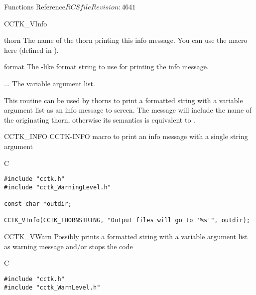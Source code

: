 \begin{cactuspart}{ Functions Reference}{$RCSfile$}{$Revision: 4641 $}
\begin{FunctionDescription}{CCTK\_VInfo}
\begin{ParameterSection}
\begin{Parameter}{thorn}
The name of the thorn printing this info message. You can use the
 macro here (defined in ).
\end{Parameter}
\begin{Parameter}{format}
The -like format string to use for printing the info message.
\end{Parameter}
\begin{Parameter}{...}
The variable argument list.
\end{Parameter}
\end{ParameterSection}

\begin{Discussion}
This routine can be used by thorns to print a formatted string with a variable
argument list as an info message to screen.
The message will include the name of the originating thorn, otherwise its
semantics is equivalent to .
\end{Discussion}

\begin{SeeAlsoSection}
\begin{SeeAlso2} {CCTK\_INFO} {CCTK-INFO}
macro to print an info message with a single string argument
\end{SeeAlso2}
\end{SeeAlsoSection}

\begin{ExampleSection}
\begin{Example}{C}
\begin{verbatim}
#include "cctk.h"
#include "cctk_WarningLevel.h"

const char *outdir;

CCTK_VInfo(CCTK_THORNSTRING, "Output files will go to '%s'", outdir);
\end{verbatim}
\end{Example}
\end{ExampleSection}
\end{FunctionDescription}


\begin{FunctionDescription}{CCTK\_VWarn}
\label{CCTK-VWarn}
Possibly prints a formatted string with a variable argument list as
warning message and/or stops the code

\begin{SynopsisSection}
\begin{Synopsis}{C}
\begin{verbatim}
#include "cctk.h"
#include "cctk_WarnLevel.h"


\end{verbatim}
\end{Synopsis}
\end{SynopsisSection}
\end{FunctionDescription}
\end{cactuspart}
